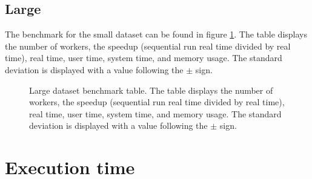 \subsection{Large}
The benchmark for the small dataset can be found in figure \ref{fig:dataset_4_table}.
The table displays the number of workers, the speedup (sequential run real time divided by real time), real time,
user time, system time, and memory usage. The standard deviation is displayed with a value following the $\pm$ sign.

\begin{figure}[ht]
\centering
{}
\caption[Large dataset benchmark table.]{Large dataset benchmark table. The table displays the number of workers, the speedup (sequential run real time divided by real time), real time,
user time, system time, and memory usage. The standard deviation is displayed with a value following the $\pm$ sign.}
\label{fig:dataset_4_table}
\end{figure}

\section{Execution time}

